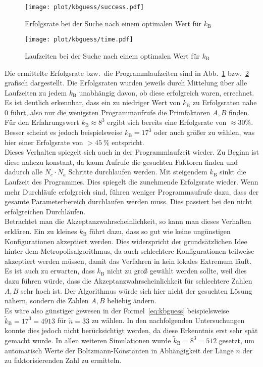\begin{figure}[!ht]
		\centering
		\texttt{[image: plot/kbguess/success.pdf]}
		\caption{Erfolgsrate bei der Suche nach einem optimalen Wert für $k_\mathrm{B}$}\label{fig:kbguess-success}
\end{figure}

\begin{figure}[!ht]
		\centering
		\texttt{[image: plot/kbguess/time.pdf]}
		\caption{Laufzeiten bei der Suche nach einem optimalen Wert für $k_\mathrm{B}$}\label{fig:kbguess-runtime}
\end{figure}

Die ermittelte Erfolgsrate bzw.\ die Programmlaufzeiten sind in Abb.~\ref{fig:kbguess-success} bzw.~\ref{fig:kbguess-runtime} grafisch dargestellt. Die Erfolgsraten wurden jeweils durch Mittelung über alle Laufzeiten zu jedem $k_\mathrm{B}$ unabhängig davon, ob diese erfolgreich waren, errechnet. \\
Es ist deutlich erkennbar, dass ein zu niedriger Wert von $k_\mathrm{B}$ zu Erfolgsraten nahe $0$ führt, also nur die wenigsten Programmaufrufe die Primfaktoren $A,B$ finden. Für den Erfahrungswert $k_\mathrm{B}\approx 8^3$ ergibt sich bereits eine Erfolgsrate von $\approx30\%$. Besser scheint es jedoch beispielsweise $k_\mathrm{B}=17^3$ oder auch größer zu wählen, was hier einer Erfolgsrate von $>\SI{45}{\percent}$ entspricht. \\
Dieses Verhalten spiegelt sich auch in der Programmlaufzeit wieder. Zu Beginn ist diese nahezu konstant, da kaum Aufrufe die gesuchten Faktoren finden und dadurch alle $N_c\cdot N_a$ Schritte durchlaufen werden. Mit steigendem $k_\mathrm{B}$ sinkt die Laufzeit des Programmes. Dies spiegelt die zunehmende Erfolgsrate wieder. Wenn mehr Durchläufe erfolgreich sind, führen weniger Programmaufrufe dazu, dass der gesamte Parameterbereich durchlaufen werden muss. Dies passiert bei den nicht erfolgreichen Durchläufen. \\
Betrachtet man die Akzeptanzwahrscheinlichkeit, so kann man dieses Verhalten erklären. Ein zu kleines $k_\mathrm{B}$ führt dazu, dass so gut wie keine ungünstigen Konfigurationen akzeptiert werden. Dies widerspricht der grundsätzlichen Idee hinter dem Metropolisalgorithmus, da auch schlechtere Konfigurationen teilweise akzeptiert werden müssen, damit das Verfahren in kein lokales Extremum läuft. Es ist auch zu erwarten, dass $k_\mathrm{B}$ nicht zu groß gewählt werden sollte, weil dies dazu führen würde, dass die Akzeptanzwahrscheinlichkeit für schlechtere Zahlen $A, B$ sehr hoch ist. Der Algorithmus würde sich hier nicht der gesuchten Lösung nähern, sondern die Zahlen $A, B$ beliebig ändern. \\
Es wäre also günstiger gewesen in der Formel~\eqref{eq:kbguess} beispielsweise $\tilde{k}_\mathrm{B}=17^3=4913$ für $\tilde{n}=33$ zu wählen. In den nachfolgenden Untersuchungen konnte dies jedoch nicht berücksichtigt werden, da diese Erkenntnis erst sehr spät gemacht wurde. In allen weiteren Simulationen wurde $\tilde{k}_\mathrm{B}=8^3=512$ gesetzt, um automatisch Werte der Boltzmann-Konstanten in Abhängigkeit der Länge $n$ der zu faktorisierenden Zahl zu ermitteln.



